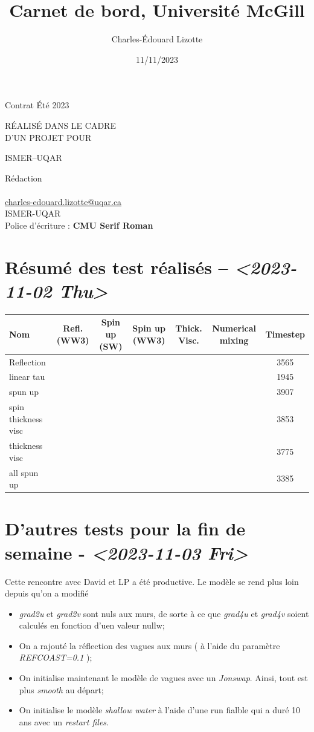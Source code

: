 \documentclass[10pt]{article}
\author{Charles-Édouard Lizotte}
\date{11/11/2023}
\title{Carnet de bord, Université McGill}
\makeatletter
\numberwithin{equation}{section}
\newcommand{\cmark}{\ding{52}}
\newcommand{\xmark}{\ding{55}}
\newcommand{\mytitlepage}{
\begin{titlepage}
\begin{center}
{\Large Contrat Été 2023 \par}
\vspace{2cm}
{\Large \MakeUppercase{\thetitle} \par}
\vspace{2cm}
RÉALISÉ DANS LE CADRE\\ D'UN PROJET POUR \par
\vspace{2cm}
{\Large ISMER--UQAR \par}
\vspace{2cm}
{\thedate}
\end{center}
\vfill
Rédaction \\
{\theauthor}\\
\url{charles-edouard.lizotte@uqar.ca}\\
ISMER-UQAR\\
Police d'écriture : \textbf{CMU Serif Roman}
\end{titlepage}
}
\makeatother
\begin{document}
\mytitlepage
\tableofcontents\newpage

\section{Résumé des test réalisés -- \textit{<2023-11-02 Thu>}}
\label{sec:org3a16c5a}
\begin{center}
\begin{tabular}{lcccccc}
Nom & Refl. (WW3) & Spin up (SW) & Spin up (WW3) & Thick. Visc. & Numerical mixing & Timestep\\[0pt]
\hline
\hline
Reflection & \cmark & \xmark & \cmark & \xmark & \cmark & 3565\\[0pt]
linear tau & \xmark & \xmark & \xmark & \xmark & \cmark & 1945\\[0pt]
spun up & \xmark & \cmark & \xmark & \xmark & \cmark & 3907\\[0pt]
spin thickness visc & \xmark & \cmark & \xmark & \cmark & \xmark & 3853\\[0pt]
thickness visc & \xmark & \xmark & \xmark & \cmark & \xmark & 3775\\[0pt]
all spun up & \cmark & \cmark & \cmark & \xmark & \xmark & 3385\\[0pt]
\hline
\end{tabular}
\end{center}



\section{D'autres tests pour la fin de semaine - \textit{<2023-11-03 Fri>}}
\label{sec:orgb1938cf}

Cette rencontre avec David et LP a été productive.
Le modèle se rend plus loin depuis qu'on a modifié
\begin{itemize}
\item \emph{grad2u} et \emph{grad2v} sont nuls aux murs, de sorte à ce que \emph{grad4u} et \emph{grad4v} soient calculés en fonction d'uen valeur nullw;
\item On a rajouté la réflection des vagues aux murs ( à l'aide du paramètre \emph{REFCOAST=0.1} );
\item On initialise maintenant le modèle de vagues avec un \emph{Jonswap}.
Ainsi, tout est plus \emph{smooth} au départ;
\item On initialise le modèle \emph{shallow water} à l'aide d'une run fialble qui a duré 10 ans avec un \emph{restart files}.
\end{itemize}
\end{document}
